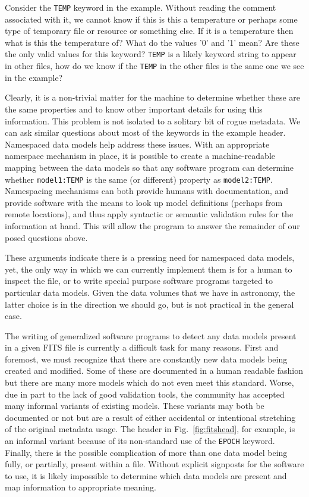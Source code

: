 \documentclass[final,authoryear,5p,times,twocolumn]{elsarticle}
\begin{document}
{{Consider the \texttt{TEMP} keyword in the example. Without reading the comment
associated with it, we cannot know if this is this a temperature or perhaps
some type of temporary file or resource or something else. If it is a
temperature then what is this the temperature of? What do the values '0'
and '1' mean? Are these the only valid values for this keyword?  \texttt{TEMP} is
a likely keyword string to appear in other files, how do we know if the
\texttt{TEMP} in the other files is the same one we see in the example?


Clearly, it is a non-trivial matter for the machine to determine whether
these are the same properties and to know other important details for using
this information. This problem is not isolated to a solitary bit
of rogue metadata. We can ask similar questions about most of the keywords
in the example header. Namespaced data models help address these issues. With
an appropriate namespace mechanism in place, it is possible to create a
machine-readable mapping between the data models so that any software program
can determine whether \texttt{model1:TEMP} is the same (or different) property as
\texttt{model2:TEMP}.
Namespacing mechanisms can both provide humans with documentation, and
provide software with the means to look up model definitions (perhaps from
remote locations), and thus apply syntactic or semantic validation rules
for the information at hand.  This will allow the program to
answer the remainder of our posed questions above.


These arguments indicate there is a pressing need for name\-spaced data models,
yet, the only way in which we can currently implement them is for a human
to inspect the file, or to write special purpose software programs targeted to
particular data models. Given the data volumes that we have in astronomy, the
latter choice is in the direction we should go, but is not practical
in the general case.


The writing of generalized software programs to detect any data models
present in a given FITS file is currently a difficult task for many reasons.
First and foremost, we must recognize that there are constantly new data models
being created and modified. Some of these are documented in a human readable
fashion but there are many more models which do not even meet this standard.
Worse, due in part to the lack of good validation tools, the community has
accepted many informal variants of existing models. These variants may both
be documented or not but are a result of either accidental or intentional
stretching of the original metadata usage. The header in
Fig.~\ref{fig:fitshead}, for example, is an informal variant because of its non-standard
use of the \texttt{EPOCH} keyword.
Finally, there is the possible complication of more than one data model being
fully, or partially, present within a file. Without explicit signposts for
the software to use, it is likely impossible to determine which data models
are present and map information to appropriate meaning.


}}
\end{document}
